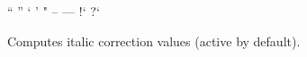           \unless \iffalse
            \begintabulate [rlrl]
              \beginrow ``  \newcell  {\inlinecode !``! } \newcell  ''  \newcell  {\inlinecode !''!} \endrow
              \beginrow `   \newcell  {\inlinecode !`!  } \newcell  '   \newcell  {\inlinecode !'! } \endrow
              \beginrow "   \newcell  {\inlinecode !"!  } \newcell  --  \newcell  {\inlinecode !--!} \endrow
              \beginrow --- \newcell  {\inlinecode !---!} \newcell  !`  \newcell  {\inlinecode ?!`?} \endrow
              \beginrow ?`  \newcell  {\inlinecode !?`! } \newcell      \newcell                     \endrow
            \endtabulate
          \else
            \startframed [frame=off,width=broad,align=middle]
              \startframed [frame=off,width=\dimexpr(\textwidth/2)]
                \startxtable [align=middle]
                    \startxrow \startxcell ``  \stopxcell \startxcell  {}  \stopxcell \startxcell  ''  \stopxcell \startxcell  {}  \stopxcell \stopxrow
                    \startxrow \startxcell `   \stopxcell \startxcell  {}   \stopxcell \startxcell  '   \stopxcell \startxcell  {}   \stopxcell \stopxrow
                    \startxrow \startxcell "   \stopxcell \startxcell  {}   \stopxcell \startxcell  --  \stopxcell \startxcell  \inlinecode {--}  \stopxcell \stopxrow
                    \startxrow \startxcell --- \stopxcell \startxcell  \inlinecode {---} \stopxcell \startxcell  !`  \stopxcell \startxcell  {}  \stopxcell \stopxrow
                    \startxrow \startxcell ?`  \stopxcell \startxcell  {}  \stopxcell \startxcell      \stopxcell \startxcell                    \stopxcell \stopxrow
                \stopxtable
              \stopframed
            \stopframed
          \fi
  \endaltitem

          Computes italic correction values (active by default).
  \endaltitem

\enddescriptions

\endsubsection
\endsection


